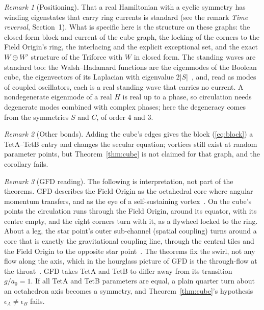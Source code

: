 \documentclass[twocolumn]{iopjournal}
\theoremstyle{definition}
\theoremstyle{remark}
\newtheorem*{remark}{Remark}
\begin{document}
\begin{remark}[Positioning]
That a real Hamiltonian with a cyclic symmetry has winding eigenstates
that carry ring currents is standard (see the remark \emph{Time reversal}, Section~1). What is specific here
is the structure on these graphs: the closed-form block and current of
the cube graph, the locking of the corners to the Field Origin's ring, the
interlacing and the explicit exceptional set, and the exact
$W \oplus W'$ structure of the Triforce with $W$ in closed form.
The standing waves are standard too: the Walsh--Hadamard functions are
the eigenmodes of the Boolean cube, the eigenvectors of its Laplacian
with eigenvalue $2\lvert S\rvert$~\cite{ODonnell2014}, and, read as
modes of coupled oscillators, each is a real standing wave that carries
no current. A nondegenerate eigenmode of a real $H$ is real up to a
phase, so circulation needs degenerate modes combined with complex
phases; here the degeneracy comes from the symmetries $S$ and $C$, of
order 4 and 3.
\end{remark}

\begin{remark}[Other bonds]
Adding the cube's edges gives the block (\ref{eq:block}) a TetA--TetB
entry and changes the secular equation; vortices still exist at random
parameter points, but Theorem~\ref{thm:cube} is not claimed for that
graph, and the corollary fails.
\end{remark}

\begin{remark}[GFD reading]
The following is interpretation, not part of the theorems. GFD
describes the Field Origin as the octahedral core where angular momentum
transfers, and as the eye of a self-sustaining vortex~\cite{NelsonColes}.
On the cube's points the circulation runs through the Field Origin, around its
equator, with its centre empty, and the eight corners turn with it, as a
flywheel locked to the ring. About a leg, the star point's outer
sub-channel (spatial coupling) turns around a core that is exactly the
gravitational coupling line, through the central tiles and the Field
Origin to the opposite star point~\cite{NelsonTriforce}. The theorems fix
the swirl, not any flow along the axis, which in the hourglass picture
of GFD is the through-flow at the throat~\cite{NelsonHourglass}. GFD takes TetA and TetB to
differ away from its transition $g/a_0 = 1$. If all TetA and TetB
parameters are equal, a plain quarter turn about an octahedron axis
becomes a symmetry, and Theorem~\ref{thm:cube}'s hypothesis
$\epsilon_A \neq \epsilon_B$ fails.
\end{remark}
\end{document}
